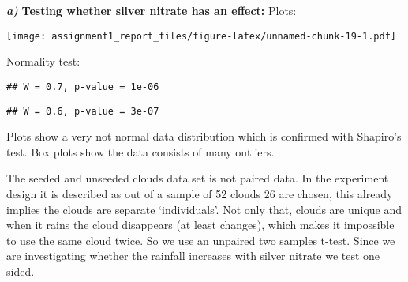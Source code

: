 \documentclass[
]{article}
\newenvironment{Shaded}{\begin{snugshade}}{\end{snugshade}}
\newcommand{\FunctionTok}[1]{\textcolor[rgb]{0.00,0.00,0.00}{#1}}
\newcommand{\NormalTok}[1]{#1}
\newcommand{\SpecialCharTok}[1]{\textcolor[rgb]{0.00,0.00,0.00}{#1}}
\begin{document}
\textbf{\emph{a)}} \textbf{Testing whether silver nitrate has an
effect:} Plots:

\begin{Shaded}
\end{Shaded}

\texttt{[image: assignment1\_report\_files/figure-latex/unnamed-chunk-19-1.pdf]}

Normality test:

\begin{Shaded}
\end{Shaded}

\begin{verbatim}
## W = 0.7, p-value = 1e-06
\end{verbatim}

\begin{Shaded}
\end{Shaded}

\begin{verbatim}
## W = 0.6, p-value = 3e-07
\end{verbatim}

Plots show a very not normal data distribution which is confirmed with
Shapiro's test. Box plots show the data consists of many outliers.

The seeded and unseeded clouds data set is not paired data. In the
experiment design it is described as out of a sample of 52 clouds 26 are
chosen, this already implies the clouds are separate `individuals'. Not
only that, clouds are unique and when it rains the cloud disappears (at
least changes), which makes it impossible to use the same cloud twice.
So we use an unpaired two samples t-test. Since we are investigating
whether the rainfall increases with silver nitrate we test one sided.
\end{document}

